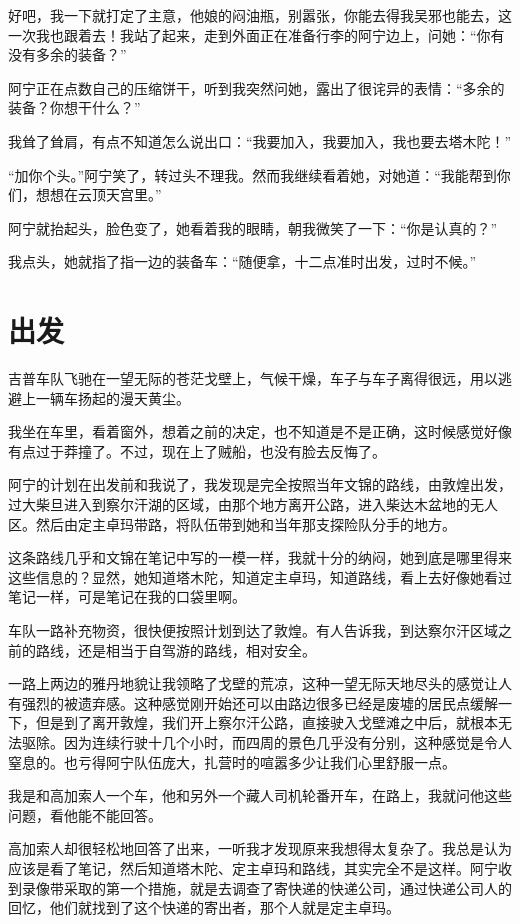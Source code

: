 好吧，我一下就打定了主意，他娘的闷油瓶，别嚣张，你能去得我吴邪也能去，这一次我也跟着去！我站了起来，走到外面正在准备行李的阿宁边上，问她：“你有没有多余的装备？”

阿宁正在点数自己的压缩饼干，听到我突然问她，露出了很诧异的表情：“多余的装备？你想干什么？”

我耸了耸肩，有点不知道怎么说出口：“我要加入，我要加入，我也要去塔木陀！”

“加你个头。”阿宁笑了，转过头不理我。然而我继续看着她，对她道：“我能帮到你们，想想在云顶天宫里。”

阿宁就抬起头，脸色变了，她看着我的眼睛，朝我微笑了一下：“你是认真的？”

我点头，她就指了指一边的装备车：“随便拿，十二点准时出发，过时不候。”

\chapter{出发}

吉普车队飞驰在一望无际的苍茫戈壁上，气候干燥，车子与车子离得很远，用以逃避上一辆车扬起的漫天黄尘。

我坐在车里，看着窗外，想着之前的决定，也不知道是不是正确，这时候感觉好像有点过于莽撞了。不过，现在上了贼船，也没有脸去反悔了。

阿宁的计划在出发前和我说了，我发现是完全按照当年文锦的路线，由敦煌出发，过大柴旦进入到察尔汗湖的区域，由那个地方离开公路，进入柴达木盆地的无人区。然后由定主卓玛带路，将队伍带到她和当年那支探险队分手的地方。

这条路线几乎和文锦在笔记中写的一模一样，我就十分的纳闷，她到底是哪里得来这些信息的？显然，她知道塔木陀，知道定主卓玛，知道路线，看上去好像她看过笔记一样，可是笔记在我的口袋里啊。

车队一路补充物资，很快便按照计划到达了敦煌。有人告诉我，到达察尔汗区域之前的路线，还是相当于自驾游的路线，相对安全。

一路上两边的雅丹地貌让我领略了戈壁的荒凉，这种一望无际天地尽头的感觉让人有强烈的被遗弃感。这种感觉刚开始还可以由路边很多已经是废墟的居民点缓解一下，但是到了离开敦煌，我们开上察尔汗公路，直接驶入戈壁滩之中后，就根本无法驱除。因为连续行驶十几个小时，而四周的景色几乎没有分别，这种感觉是令人窒息的。也亏得阿宁队伍庞大，扎营时的喧嚣多少让我们心里舒服一点。

我是和高加索人一个车，他和另外一个藏人司机轮番开车，在路上，我就问他这些问题，看他能不能回答。

高加索人却很轻松地回答了出来，一听我才发现原来我想得太复杂了。我总是认为应该是看了笔记，然后知道塔木陀、定主卓玛和路线，其实完全不是这样。阿宁收到录像带采取的第一个措施，就是去调查了寄快递的快递公司，通过快递公司人的回忆，他们就找到了这个快递的寄出者，那个人就是定主卓玛。

